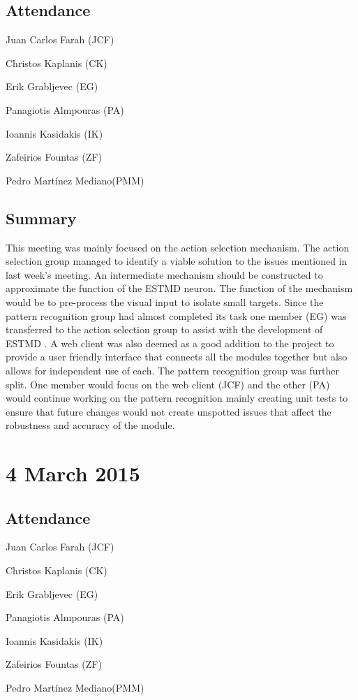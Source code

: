 \documentclass[a4paper,11pt]{article}
\begin{document}
\subsection*{Attendance}
\begin{compactenum}
\item Juan Carlos Farah (JCF)
\item Christos Kaplanis (CK)
\item Erik Grabljevec (EG)
\item Panagiotis Almpouras (PA)
\item Ioannis Kasidakis (IK)
\item Zafeirios Fountas (ZF)
\item Pedro Martínez Mediano(PMM)
\end{compactenum}

\subsection*{Summary}
This meeting was mainly focused on the action selection mechanism. The action selection group managed to identify a viable solution to the issues mentioned in last week's meeting. An intermediate mechanism should be constructed to approximate the function of the ESTMD neuron. The function of the mechanism would be to pre-process the visual input to isolate small targets. Since the pattern recognition group had almost completed its task one member (EG) was transferred to the action selection group to assist with the development of  ESTMD . A web client was also deemed as a good addition to the project to provide a user friendly interface that connects all the modules together but also allows for independent use of each. The pattern recognition group was further split. One member would focus on the web client (JCF) and the other (PA) would continue working on the pattern recognition mainly creating unit tests to ensure that future changes would not create unspotted issues that affect the robustness and accuracy of the module.

\maketitle
\section*{4 March 2015}
\subsection*{Attendance}
\begin{compactenum}
\item Juan Carlos Farah (JCF)
\item Christos Kaplanis (CK)
\item Erik Grabljevec (EG)
\item Panagiotis Almpouras (PA)
\item Ioannis Kasidakis (IK)
\item Zafeirios Fountas (ZF)
\item Pedro Martínez Mediano(PMM)
\end{compactenum}
\end{document}
